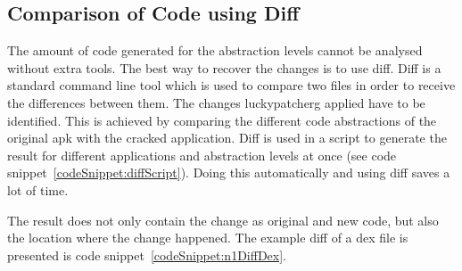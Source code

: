 \subsection{Comparison of Code using Diff} \label{subsection:forensics-tools-diff}
The amount of code generated for the abstraction levels cannot be analysed without extra tools.
The best way to recover the changes is to use diff.
Diff is a standard command line tool which is used to compare two files in order to receive the differences between them.
\newline
The changes \gls{luckypatcherg} applied have to be identified.
This is achieved by comparing the different code abstractions of the original \gls{apk} with the cracked application.
Diff is used in a script to generate the result for different applications and abstraction levels at once (see code snippet~\ref{codeSnippet:diffScript}).
Doing this automatically and using diff saves a lot of time.
\newline

The result does not only contain the change as original and new code, but also the location where the change happened.
The example diff of a dex file is presented is code snippet~\ref{codeSnippet:n1DiffDex}.
\newline

